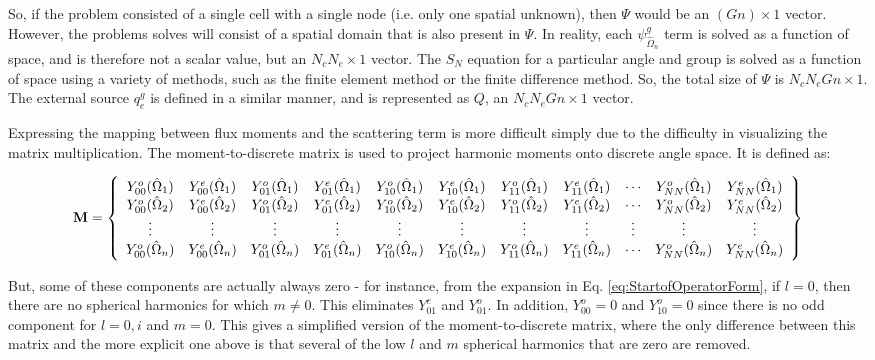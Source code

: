 \documentclass[10pt]{article}
\begin{document}
\begin{flushleft}
So, if the problem consisted of a single cell with a single node (i.e. only one spatial unknown), then \(\Psi\) would be an \((Gn)\times1\) vector. However, the problems solves will consist of a spatial domain that is also present in \(\Psi\). In reality, each \(\psi_{\hat{\Omega}_n}^g\) term is solved as a function of space, and is therefore not a scalar value, but an \(N_cN_e\times1\) vector. The \(S_N\) equation for a particular angle and group is solved as a function of space using a variety of methods, such as the finite element method or the finite difference method. So, the total size of \(\Psi\) is \(N_cN_eGn\times1\). The external source \(q_e^g\) is defined in a similar manner, and is represented as \(Q\), an \(N_cN_eGn\times1\) vector.

Expressing the mapping between flux moments and the scattering term is more difficult simply due to the difficulty in visualizing the matrix multiplication. The moment-to-discrete matrix is used to project harmonic moments onto discrete angle space. It is defined as:

\begin{equation}
\textbf{M}=\left\{
\begin{array}{*{13}c}
Y_{00}^o(\hat{\Omega}_1) & Y_{00}^e(\hat{\Omega}_1) & Y_{01}^o(\hat{\Omega}_1) & Y_{01}^e(\hat{\Omega}_1) & Y_{10}^o(\hat{\Omega}_1) & Y_{10}^e(\hat{\Omega}_1) & Y_{11}^o(\hat{\Omega}_1) & Y_{11}^e(\hat{\Omega}_1) & \cdots & Y_{NN}^o(\hat{\Omega}_1) & Y_{NN}^e(\hat{\Omega}_1)\\
Y_{00}^o(\hat{\Omega}_2) & Y_{00}^e(\hat{\Omega}_2) & Y_{01}^o(\hat{\Omega}_2) & Y_{01}^e(\hat{\Omega}_2) & Y_{10}^o(\hat{\Omega}_2) & Y_{10}^e(\hat{\Omega}_2) & Y_{11}^o(\hat{\Omega}_2) & Y_{11}^e(\hat{\Omega}_2) & \cdots & Y_{NN}^o(\hat{\Omega}_2) & Y_{NN}^e(\hat{\Omega}_2)\\
\vdots & \vdots & \vdots & \vdots & \vdots & \vdots & \vdots & \vdots & \vdots & \vdots & \vdots \\
Y_{00}^o(\hat{\Omega}_n) & Y_{00}^e(\hat{\Omega}_n) & Y_{01}^o(\hat{\Omega}_n) & Y_{01}^e(\hat{\Omega}_n) & Y_{10}^o(\hat{\Omega}_n) & Y_{10}^e(\hat{\Omega}_n) & Y_{11}^o(\hat{\Omega}_n) & Y_{11}^e(\hat{\Omega}_n) & \cdots & Y_{NN}^o(\hat{\Omega}_n) & Y_{NN}^e(\hat{\Omega}_n)\\
\end{array}\right\}
\end{equation}

But, some of these components are actually always zero - for instance, from the expansion in Eq. \eqref{eq:StartofOperatorForm}, if \(l=0\), then there are no spherical harmonics for which \(m\neq0\). This eliminates \(Y_{01}^e\) and \(Y_{01}^o\). In addition, \(Y_{00}^o=0\) and \(Y_{10}^o=0\) since there is no odd component for \(l=0,i\) and \(m=0\). This gives a simplified version of the moment-to-discrete matrix, where the only difference between this matrix and the more explicit one above is that several of the low \(l\) and \(m\) spherical harmonics that are zero are removed.


\end{flushleft}
\end{document}
